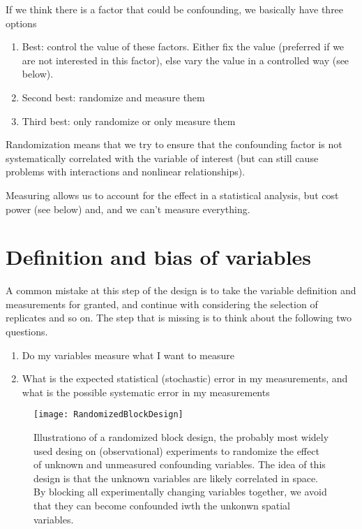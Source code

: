 \documentclass[a4paper,twoside]{tufte-book}\usepackage[]{graphicx}\usepackage[]{color}
\begin{document}
If we think there is a factor that could be confounding, we basically have three options

\begin{enumerate}
\item Best: control the value of these factors. Either fix the value (preferred if we are not interested in this factor), else vary the value in a controlled way (see below).
\item Second best: randomize and measure them
\item Third best: only randomize or only measure them
\end{enumerate}

Randomization means that we try to ensure that the confounding factor is not systematically correlated with the variable of interest (but can still cause problems with interactions and nonlinear relationships).


Measuring allows us to account for the effect in a statistical analysis, but cost power (see below) and, and we can't measure everything.

\section{Definition and bias of variables}

A common mistake at this step of the design is to take the variable definition and measurements for granted, and continue with considering the selection of replicates and so on. The step that is missing is to think about the following two questions. 

\begin{enumerate}
  \item Do my variables measure what I want to measure
  \item What is the expected statistical (stochastic) error in my measurements, and what is the possible systematic error in my measurements
\end{enumerate}

\begin{figure}[]
\begin{center}
\texttt{[image: RandomizedBlockDesign]}
\caption{Illustrationo of a randomized block design, the probably most widely used desing on (observational) experiments to randomize the effect of unknown and unmeasured confounding variables. The idea of this design is that the unknown variables are likely correlated in space. By blocking all experimentally changing variables together, we avoid that they can become confounded iwth the unkonwn spatial variables.}
\label{fig: RandomizedBlockDesign}
\end{center}
\end{figure}
\end{document}
